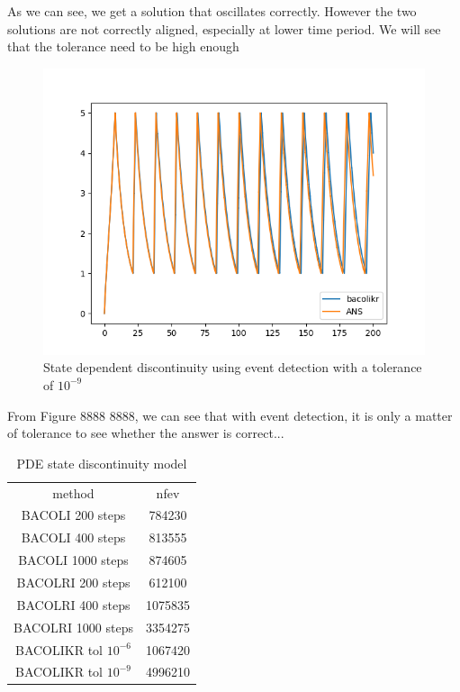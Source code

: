 \documentclass{article}
\begin{document}
As we can see, we get a solution that oscillates correctly. However the two solutions are not correctly aligned, especially at lower time period. We will see that the tolerance need to be high enough

\begin{figure}[H]
\centering
\includegraphics[width=0.7\linewidth]{./figures/pde_state_disc_event_tol_9}
\caption{State dependent discontinuity using event detection with a tolerance of $10^{-9}$}
\label{fig:pde_state_disc_event_tol_9}
\end{figure}

From Figure 8888 8888, we can see that with event detection, it is only a matter of tolerance to see whether the answer is correct...

\begin{table}[h]
\caption {PDE state discontinuity model} 
\label{tab:pde_state_nfev}
\begin{center}
\begin{tabular}{ c c } 
method                  & nfev \\ 
BACOLI 200 steps        & 784230    \\
BACOLI 400 steps        & 813555    \\
BACOLI 1000 steps       & 874605    \\
BACOLRI 200 steps       & 612100    \\
BACOLRI 400 steps       & 1075835    \\
BACOLRI 1000 steps      & 3354275    \\
BACOLIKR tol $10^{-6}$  & 1067420    \\
BACOLIKR tol $10^{-9}$  & 4996210    \\
\end{tabular}
\end{center}
\end{table} 
\end{document}
